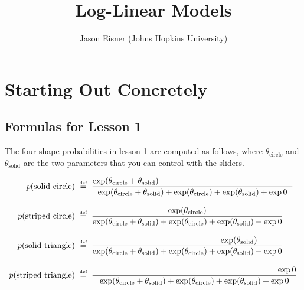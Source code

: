 \documentclass[11pt]{article}
\newcommand{\defeq}{\;\stackrel{\mbox{\tiny def}}{=}\;}
\begin{document}
\title{\vspace{-2cm}Log-Linear Models}
\author{Jason Eisner (Johns Hopkins University)}
\date{}
\maketitle

\begin{center}
\end{center}

\section{Starting Out Concretely}\label{sec:concrete}

\subsection{Formulas for Lesson 1}

The four shape probabilities in lesson 1 are computed as follows,
where $\theta_{\textrm{circle}}$ and $\theta_{\textrm{solid}}$ are the
two parameters that you can control with the sliders.


\begin{align}
p(\text{solid circle}) & \defeq \frac{\exp (\theta_{\textrm{circle}}+\theta_{\textrm{solid}})\hspace{57mm}}{\exp (\theta_{\textrm{circle}} + \theta_{\textrm{solid}}) + \exp (\theta_{\textrm{circle}}) + \exp (\theta_{\textrm{solid}}) + \exp 0} \label{eqn:solidcircle}\\
\rule{0in}{1.5\baselineskip}
p(\text{striped circle}) & \defeq \frac{\exp (\theta_{\textrm{circle}})\hspace{0mm}}{\exp (\theta_{\textrm{circle}} + \theta_{\textrm{solid}}) + \exp (\theta_{\textrm{circle}}) + \exp (\theta_{\textrm{solid}}) + \exp 0} \label{eqn:stripedcircle}\\
\rule{0in}{1.5\baselineskip}
p(\text{solid triangle}) & \defeq \frac{\hspace{44mm}\exp (\theta_{\textrm{solid}})}{\exp (\theta_{\textrm{circle}} + \theta_{\textrm{solid}}) + \exp (\theta_{\textrm{circle}}) + \exp (\theta_{\textrm{solid}}) + \exp 0} \label{eqn:solidtriangle}\\
\rule{0in}{1.5\baselineskip}
p(\text{striped triangle}) & \defeq \frac{\hspace{79mm}\exp 0}{\exp (\theta_{\textrm{circle}} + \theta_{\textrm{solid}}) + \exp (\theta_{\textrm{circle}}) + \exp (\theta_{\textrm{solid}}) + \exp 0} \label{eqn:stripedtriangle}
\end{align}
\end{document}
